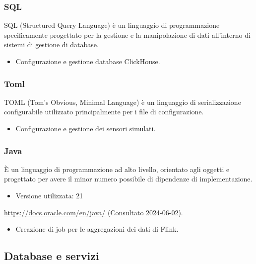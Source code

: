 \subsubsection{SQL}
SQL (Structured Query Language) è un linguaggio di programmazione specificamente progettato per la gestione e la manipolazione di dati all'interno di sistemi di gestione di database.
\begin{itemize}
        \item Configurazione e gestione database ClickHouse.
\end{itemize}
\subsubsection{Toml} 
TOML (Tom's Obvious, Minimal Language) è un linguaggio di serializzazione configurabile utilizzato principalmente per i file di configurazione.
\begin{itemize}
    \item Configurazione e gestione dei sensori simulati.
\end{itemize}

\subsubsection{Java} 
È un linguaggio di programmazione ad alto livello, orientato agli oggetti e progettato per avere il minor numero possibile di dipendenze di implementazione.
\begin{itemize}
    \item Versione utilizzata: 21
\end{itemize}
\begin{center}
    \url{https://docs.oracle.com/en/java/} (Consultato 2024-06-02).
\end{center}
\begin{itemize}
    \item Creazione di job per le aggregazioni dei dati di Flink.
\end{itemize}

\subsection{Database e servizi}

